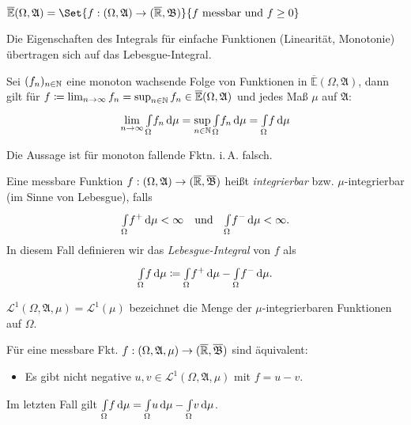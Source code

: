 \documentclass{cheat-sheet}
\newcommand{\Alg}{\mathfrak{A}} %
\newcommand{\Bor}{\mathfrak{B}} %
\newcommand{\E}{\mathbb{E}} %
\newcommand{\Leb}{\mathcal{L}} %
\theoremstyle{definition}
\newcommand{\IntOmu}[1]{\Int{\Omega}{}{#1}{\mu}} %
\begin{document}

\begin{satz}
  $\overline{\E}(\Omega, \Alg) = \Set{ f : (\Omega, \Alg) \to (\ER, \Bor) }{ f \text{ messbar und } f \geq 0 }$
\end{satz}

\begin{satz}
  Die Eigenschaften des Integrals für einfache Funktionen (Linearität, Monotonie) übertragen sich auf das Lebesgue-Integral.
\end{satz}

\begin{satz}
  Sei $(f_n)_{n \in \mathbb{N}}$ eine monoton wachsende Folge von Funktionen in $\overline{\E}(\Omega, \Alg)$, dann gilt für $f \coloneqq \lim_{n \to \infty} f_n = \sup_{n \in \N} f_n \in \overline{\E}(\Omega, \Alg)$ und jedes Maß $\mu$ auf $\Alg$:
  \[ \lim_{n \to \infty} \IntOmu{f_n} = \sup_{n \in \N} \IntOmu{f_n} = \IntOmu{f} \]
\end{satz}

\begin{bem}
  Die Aussage ist für monoton fallende Fktn. i.\,A. falsch.
\end{bem}


\begin{defn}
  Eine messbare Funktion $f : (\Omega, \Alg) \to (\ER, \overline{\Bor})$ heißt \emph{integrierbar} bzw. $\mu$-integrierbar (im Sinne von Lebesgue), falls
  \[ \IntOmu{f^+} < \infty \quad \text{und} \quad \IntOmu{f^-} < \infty. \]
  In diesem Fall definieren wir das \emph{Lebesgue-Integral} von $f$ als
  \[ \IntOmu{f} \coloneqq \IntOmu{f^+} - \IntOmu{f^-}. \]
\end{defn}

\begin{nota}
  $\Leb^1(\Omega, \Alg, \mu) = \Leb^1(\mu)$ bezeichnet die Menge der $\mu$-integrierbaren Funktionen auf $\Omega$.
\end{nota}

\begin{satz}
  Für eine messbare Fkt. $f : (\Omega, \Alg, \mu) \to (\ER, \overline{\Bor})$ sind äquivalent:
  \begin{itemize}
    \item Es gibt nicht negative $u, v \in \Leb^1(\Omega, \Alg, \mu)$ mit $f = u - v$.
  \end{itemize}
  Im letzten Fall gilt $\IntOmu{f} = \IntOmu{u} - \IntOmu{v}$.
\end{satz}
\end{document}
